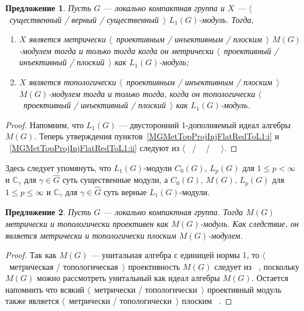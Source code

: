 \documentclass{article}
\numberwithin{equation}{section}
\theoremstyle{plain}
\newtheorem{propos}{Предложение}
\theoremstyle{definition}
\newtheorem{proof}{Доказательство}\def\theproof{}
\begin{document}
\begin{fulltext}
\begin{propos}\label{MGMetTopProjInjFlatRedToL1} Пусть $G$ --- локально
компактная группа и $X$ --- $\langle$~существенный / верный /
существенный~$\rangle$ $L_1(G)$-модуль. Тогда,
\begin{enumerate}[label = (\roman*)]
    \item $X$ является метрически $\langle$~проективным / инъективным /
    плоским~$\rangle$ $M(G)$-модулем тогда и только тогда когда он метрически
    $\langle$~проективный / инъективный / плоский~$\rangle$ как
    $L_1(G)$-модуль;\label{MGMetTopProjInjFlatRedToL1:i}
    \item $X$ является топологически $\langle$~проективным / инъективным /
    плоским~$\rangle$ $M(G)$-модулем тогда и только тогда, когда он
    топологически $\langle$~проективный / инъективный / плоский~$\rangle$ как
    $L_1(G)$-модуль.\label{MGMetTopProjInjFlatRedToL1:ii}
\end{enumerate}
\end{propos}
\begin{proof} Напомним, что $L_1(G)$ --- двусторонний 1-дополняемый идеал
алгебры $M(G)$. Теперь утверждения пунктов~\ref{MGMetTopProjInjFlatRedToL1:i} и
~\ref{MGMetTopProjInjFlatRedToL1:ii} следуют из
$\langle$~\cite[предложение~2.6]{NemGeomProjInjFlatBanMod} /
~\cite[предложение~2.16]{NemGeomProjInjFlatBanMod} /
~\cite[предложение~2.24]{NemGeomProjInjFlatBanMod}~$\rangle$.
\end{proof} 

Здесь следует упомянуть, что $L_1(G)$-модули $C_0(G)$, $L_p(G)$ для $1\leq
p<\infty$ и $\mathbb{C}_\gamma$ для $\gamma\in\widehat{G}$ суть существенные
модули, а $C_0(G)$, $M(G)$, $L_p(G)$ для $1\leq p\leq \infty$ и
$\mathbb{C}_\gamma$ для $\gamma\in\widehat{G}$ суть верные $L_1(G)$-модули. 

\begin{propos}\label{MGModMGMetTopProjFlatCharac} Пусть $G$ --- локально
компактная группа. Тогда $M(G)$ метрически и топологически проективен как
$M(G)$-модуль. Как следствие, он является метрически и топологически плоским
$M(G)$-модулем.
\end{propos} 
\begin{proof} Так как $M(G)$ --- унитальная алгебра с единицей нормы 1, то
$\langle$~метрическая / топологическая~$\rangle$ проективность $M(G)$ следует из
~\cite[предложение~7]{NemMetTopProjIdBanAlg}, поскольку $M(G)$ можно рассмотреть
унитальный как идеал алгебры $M(G)$. Остается напомнить что всякий
$\langle$~метрически / топологически~$\rangle$ проективный модуль также является
$\langle$~метрически / топологически~$\rangle$ плоским
~\cite[предложение~2.26]{NemGeomProjInjFlatBanMod}.
\end{proof}


\end{fulltext}
\end{document}
